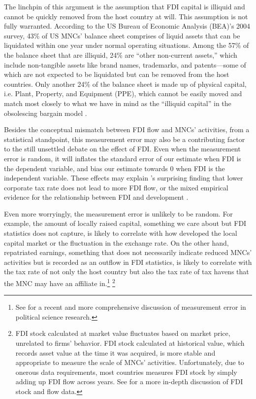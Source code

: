 The linchpin of this argument is the assumption that FDI capital is illiquid and
cannot be quickly removed from the host country at will. This assumption is not
fully warranted. According to the US Bureau of Economic Analysis (BEA)'s 2004
survey, 43\% of US MNCs' balance sheet comprises of liquid assets that can be
liquidated within one year under normal operating situations. Among the 57\% of
the balance sheet that are illiquid, 24\% are ``other non-current assets,''
which include non-tangible assets like brand names, trademarks, and
patents---some of which are not expected to be liquidated but can be removed
from the host countries. Only another 24\% of the balance sheet is made up of
physical capital, i.e. Plant, Property, and Equipment (PPE), which cannot be
easily moved and match most closely to what we have in mind as the ``illiquid
capital'' in the obsolescing bargain model \citep[113]{Kerner2014a}.

Besides the conceptual mismatch between FDI flow and MNCs' activities, from a
statistical standpoint, this measurement error may also be a contributing factor
to the still unsettled debate on the effect of FDI. Even when the measurement
error is random, it will inflates the standard error of our estimate when FDI is
the dependent variable, and bias our estimate towards 0 when FDI is the
independent variable. These effects may explain \citet{Jensen2012}'s surprising
finding that lower corporate tax rate does not lead to more FDI flow, or the
mixed empirical evidence for the relationship between FDI and development
\citep[108]{Mold2004}.

Even more worryingly, the measurement error is unlikely to be random. For
example, the amount of locally raised capital, something we care about but FDI
statistics does not capture, is likely to correlate with how developed the local
capital market or the fluctuation in the exchange rate. On the other hand,
repatriated earnings, something that does not necessarily indicate reduced MNCs'
activities but is recorded as an outflow in FDI statistics, is likely to
correlate with the tax rate of not only the host country but also the tax rate
of tax havens that the MNC may have an affiliate in.\footnote{See
\citet{Gallop2017} for a recent and more comprehensive discussion of measurement
error in political science research.} \footnote{FDI stock calculated at market
value fluctuates based on market price, unrelated to firms' behavior. FDI stock
calculated at historical value, which records asset value at the time it was
acquired, is more stable and appropriate to measure the scale of MNCs'
activities. Unfortunately, due to onerous data requirements, most countries
measures FDI stock by simply adding up FDI flow across years. See
\citet[809]{Kerner2014} for a more in-depth discussion of FDI stock and flow
data.}

